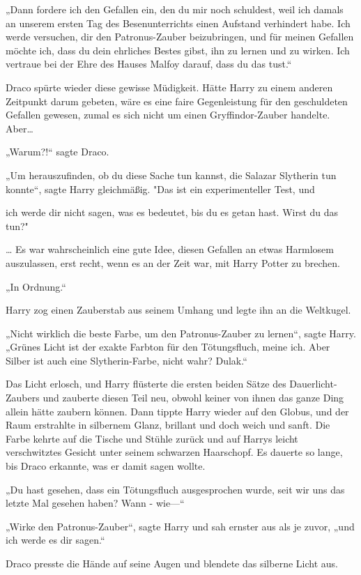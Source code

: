 {„Dann fordere ich den Gefallen ein, den du mir noch schuldest, weil ich damals an unserem ersten Tag des Besenunterrichts einen Aufstand verhindert habe. Ich werde versuchen, dir den Patronus-Zauber beizubringen, und für meinen Gefallen möchte ich, dass du dein ehrliches Bestes gibst, ihn zu lernen und zu wirken. Ich vertraue bei der Ehre des Hauses Malfoy darauf, dass du das tust.“

Draco spürte wieder diese gewisse Müdigkeit. Hätte Harry zu einem anderen Zeitpunkt darum gebeten, wäre es eine faire Gegenleistung für den geschuldeten Gefallen gewesen, zumal es sich nicht um einen Gryffindor-Zauber handelte. Aber…

„Warum?!“ sagte Draco.

„Um herauszufinden, ob du diese Sache tun kannst, die Salazar Slytherin tun konnte“, sagte Harry gleichmäßig. "Das ist ein experimenteller Test, und

ich werde dir nicht sagen, was es bedeutet, bis du es getan hast. Wirst du das tun?"

… Es war wahrscheinlich eine gute Idee, diesen Gefallen an etwas Harmlosem auszulassen, erst recht, wenn es an der Zeit war, mit Harry Potter zu brechen.

„In Ordnung.“

Harry zog einen Zauberstab aus seinem Umhang und legte ihn an die Weltkugel.

„Nicht wirklich die beste Farbe, um den Patronus-Zauber zu lernen“, sagte Harry. „Grünes Licht ist der exakte Farbton für den Tötungsfluch, meine ich. Aber Silber ist auch eine Slytherin-Farbe, nicht wahr? Dulak.“

Das Licht erlosch, und Harry flüsterte die ersten beiden Sätze des Dauerlicht-Zaubers und zauberte diesen Teil neu, obwohl keiner von ihnen das ganze Ding allein hätte zaubern können. Dann tippte Harry wieder auf den Globus, und der Raum erstrahlte in silbernem Glanz, brillant und doch weich und sanft. Die Farbe kehrte auf die Tische und Stühle zurück und auf Harrys leicht verschwitztes Gesicht unter seinem schwarzen Haarschopf. Es dauerte so lange, bis Draco erkannte, was er damit sagen wollte.

„Du hast gesehen, dass ein Tötungsfluch ausgesprochen wurde, seit wir uns das letzte Mal gesehen haben? Wann - wie—“

„Wirke den Patronus-Zauber“, sagte Harry und sah ernster aus als je zuvor, „und ich werde es dir sagen.“

Draco presste die Hände auf seine Augen und blendete das silberne Licht aus.

}
